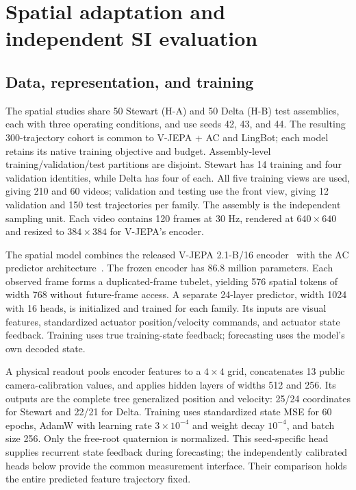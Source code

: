 \documentclass[10pt,twocolumn,letterpaper]{article}
\begin{document}
\section{Spatial adaptation and independent SI evaluation}
\label{app:spatial}
\subsection{Data, representation, and training}
The spatial studies share 50 Stewart (H-A) and 50 Delta (H-B) test assemblies, each with three operating conditions, and use seeds 42, 43, and 44. The resulting 300-trajectory cohort is common to V-JEPA + AC and LingBot; each model retains its native training objective and budget. Assembly-level training/validation/test partitions are disjoint. Stewart has 14 training and four validation identities, while Delta has four of each. All five training views are used, giving 210 and 60 videos; validation and testing use the front view, giving 12 validation and 150 test trajectories per family. The assembly is the independent sampling unit. Each video contains 120 frames at 30 Hz, rendered at $640\times640$ and resized to $384\times384$ for V-JEPA's encoder.

The spatial model combines the released V-JEPA 2.1-B/16 encoder~\cite{murlabadia2026vjepa2_1} with the AC predictor architecture~\cite{assran2025vjepa2}. The frozen encoder has 86.8 million parameters. Each observed frame forms a duplicated-frame tubelet, yielding 576 spatial tokens of width 768 without future-frame access. A separate 24-layer predictor, width 1024 with 16 heads, is initialized and trained for each family. Its inputs are visual features, standardized actuator position/velocity commands, and actuator state feedback. Training uses true training-state feedback; forecasting uses the model's own decoded state.

A physical readout pools encoder features to a $4\times4$ grid, concatenates 13 public camera-calibration values, and applies hidden layers of widths 512 and 256. Its outputs are the complete tree generalized position and velocity: 25/24 coordinates for Stewart and 22/21 for Delta. Training uses standardized state MSE for 60 epochs, AdamW with learning rate $3\times10^{-4}$ and weight decay $10^{-4}$, and batch size 256. Only the free-root quaternion is normalized. This seed-specific head supplies recurrent state feedback during forecasting; the independently calibrated heads below provide the common measurement interface. Their comparison holds the entire predicted feature trajectory fixed.
\end{document}
